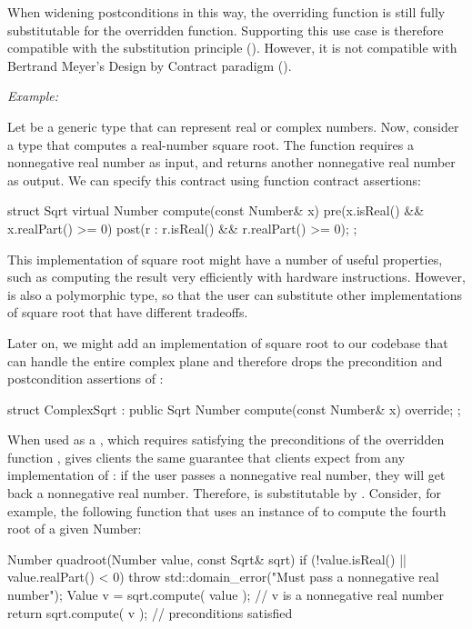 When widening postconditions in this way, the overriding function is still fully substitutable for the overridden function. Supporting this use case is therefore compatible with the substitution principle (). However, it is not  compatible with Bertrand Meyer's Design by Contract paradigm ().

\emph{Example:}

Let  be a generic type that can represent real or complex numbers. Now, consider a type  that computes a real-number square root. The function  requires a nonnegative real number as input, and returns another nonnegative real number as output. We can specify this contract using function contract assertions:

\begin{codeblock}
struct Sqrt {
  virtual Number compute(const Number& x)
    pre(x.isReal() && x.realPart() >= 0)
    post(r : r.isReal() && r.realPart() >= 0);
};
\end{codeblock}

This implementation of square root might have a number of useful properties, such as computing the result very efficiently with hardware instructions. However,  is also a polymorphic type, so that the user can substitute other implementations of square root that have different tradeoffs.

Later on, we might add an implementation of square root to our codebase that can handle the entire complex plane and therefore drops the precondition and postcondition assertions of :

\begin{codeblock}
struct ComplexSqrt : public Sqrt {
  Number compute(const Number& x) override;
};
\end{codeblock}

When used as a , which requires satisfying the preconditions of the overridden function , \allowbreak{} gives clients the same guarantee that clients  expect from any implementation of : if the user passes a nonnegative real number, they will get back a nonnegative real number. Therefore,  is substitutable by . Consider, for example, the following function that uses an instance of  to compute the fourth root of a given Number:

\begin{codeblock}
Number quadroot(Number value, const Sqrt& sqrt) {
  if (!value.isReal() || value.realPart() < 0) {
    throw std::domain_error("Must pass a nonnegative real number");
  }
  Value v = sqrt.compute( {value} ); // v is a nonnegative real number
  return sqrt.compute( {v} ); // preconditions satisfied 
}
\end{codeblock}

